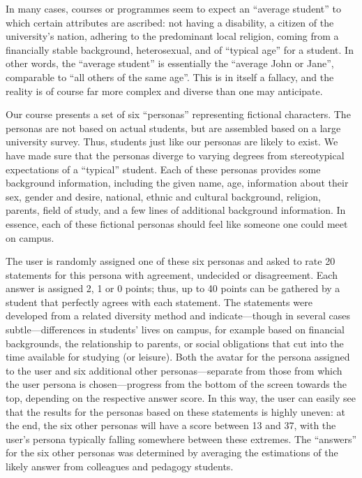 \documentclass[sigconf,screen]{acmart}
\begin{document}
In many cases, courses or programmes seem to expect an ``average student'' to which
certain attributes are ascribed: not having  a disability, a citizen of the university's nation,
adhering to the predominant local religion, coming from a financially stable background,
heterosexual, and of ``typical age'' for a student. In other words, the ``average student''
is essentially the ``average John or Jane'', comparable to ``all others of the same age''.
This is in itself a fallacy, and the reality is of course far more complex and diverse than
one may anticipate.

Our course presents a set of six ``personas'' representing fictional characters. The
personas are not based on actual students, but are assembled based on a large
university survey. Thus, students just like our personas are likely to exist.
We have made sure that the personas diverge to varying degrees from stereotypical expectations
of a ``typical'' student. Each of these personas provides some background information, including the
given name, age, information about their sex, gender and desire, national, ethnic and
cultural background, religion, parents, field of study, and a few lines of additional
background information. In essence, each of these fictional personas
should feel like someone one could meet on campus.

The user is randomly assigned one of these six personas and asked to rate 20
statements for this persona with agreement, undecided or disagreement. Each answer
is assigned 2, 1 or 0 points; thus, up to 40 points can be gathered by a student
that perfectly agrees with each statement. The statements were developed from a
related diversity method and indicate---though in several cases subtle---differences
in students' lives on campus, for example based on financial backgrounds, the relationship
to parents, or social obligations that cut into the time available for studying
(or leisure). Both the avatar for the persona assigned to the user  and six additional
other personas---separate from those from which the user persona is chosen---progress
from the bottom of the screen towards the top, depending on the respective answer
score. In this way, the user can easily see that the results for the personas based
on these statements is highly uneven: at the end, the six other personas will have a
score between 13 and 37, with the user's persona typically falling
somewhere between these extremes. The ``answers'' for the six other personas was determined by
averaging the estimations of the likely answer from colleagues and pedagogy students. 
\end{document}
